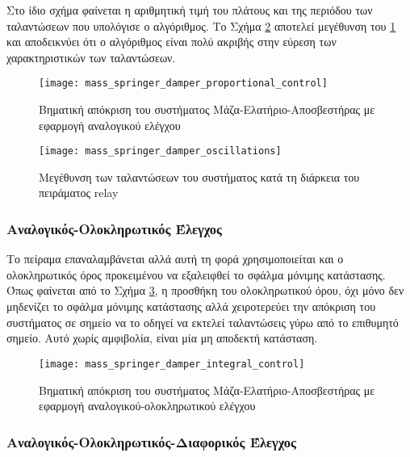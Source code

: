 Στο ίδιο σχήμα φαίνεται η αριθμητική τιμή του πλάτους και της περιόδου των ταλαντώσεων που υπολόγισε ο αλγόριθμος. Το Σχήμα \ref{fig:mass_springer_damper_oscillations} αποτελεί μεγέθυνση του \ref{fig:mass_springer_damper_proportional_control} και αποδεικνύει ότι ο αλγόριθμος είναι πολύ ακριβής στην εύρεση των χαρακτηριστικών των ταλαντώσεων. 

\begin{figure}[h]
  \centering
  \texttt{[image: mass\_springer\_damper\_proportional\_control]}
  \caption{Βηματική απόκριση του συστήματος Μάζα-Ελατήριο-Αποσβεστήρας με εφαρμογή αναλογικού ελέγχου}
  \label{fig:mass_springer_damper_proportional_control}
\end{figure}

\begin{figure}[h]
  \centering
  \texttt{[image: mass\_springer\_damper\_oscillations]}
  \caption{Μεγέθυνση των ταλαντώσεων του συστήματος κατά τη διάρκεια του πειράματος relay}
  \label{fig:mass_springer_damper_oscillations}
\end{figure}

\subsubsection{Αναλογικός-Ολοκληρωτικός Έλεγχος}

Το πείραμα επαναλαμβάνεται αλλά αυτή τη φορά χρησιμοποιείται και ο ολοκληρωτικός όρος προκειμένου να εξαλειφθεί το σφάλμα μόνιμης κατάστασης. Όπως φαίνεται από το Σχήμα \ref{fig:mass_springer_damper_integral_control}, η προσθήκη του ολοκληρωτικού όρου, όχι μόνο δεν μηδενίζει το σφάλμα μόνιμης κατάστασης αλλά χειροτερεύει την απόκριση του συστήματος σε σημείο να το οδηγεί να εκτελεί ταλαντώσεις γύρω από το επιθυμητό σημείο. Αυτό χωρίς αμφιβολία, είναι μία μη αποδεκτή κατάσταση.

\begin{figure}[h]
  \centering
  \texttt{[image: mass\_springer\_damper\_integral\_control]}
  \caption{Βηματική απόκριση του συστήματος Μάζα-Ελατήριο-Αποσβεστήρας με εφαρμογή αναλογικού-ολοκληρωτικού ελέγχου}
  \label{fig:mass_springer_damper_integral_control}
\end{figure}

\subsubsection{Αναλογικός-Ολοκληρωτικός-Διαφορικός Έλεγχος}

